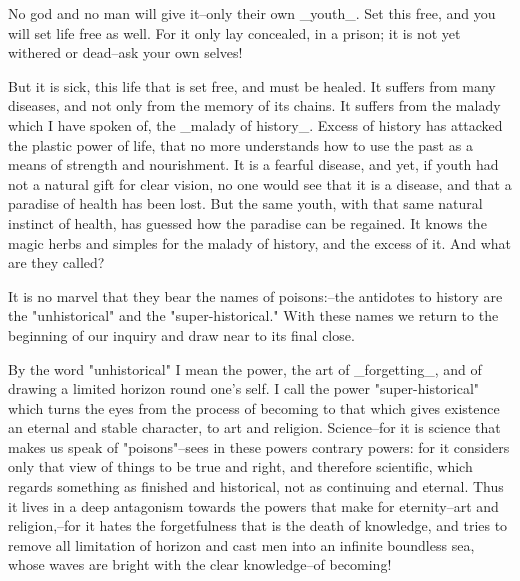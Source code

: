 No god and no man will give it--only their own _youth_. Set this
free, and you will set life free as well. For it only lay concealed,
in a prison; it is not yet withered or dead--ask your own selves!

But it is sick, this life that is set free, and must be healed. It
suffers from many diseases, and not only from the memory of its
chains. It suffers from the malady which I have spoken of, the
_malady of history_. Excess of history has attacked the plastic power
of life, that no more understands how to use the past as a means of
strength and nourishment. It is a fearful disease, and yet, if youth
had not a natural gift for clear vision, no one would see that it is
a disease, and that a paradise of health has been lost. But the same
youth, with that same natural instinct of health, has guessed how the
paradise can be regained. It knows the magic herbs and simples for
the malady of history, and the excess of it. And what are they
called?

It is no marvel that they bear the names of poisons:--the antidotes
to history are the "unhistorical" and the "super-historical." With
these names we return to the beginning of our inquiry and draw near
to its final close.

By the word "unhistorical" I mean the power, the art of _forgetting_,
and of drawing a limited horizon round one's self. I call the power
"super-historical" which turns the eyes from the process of becoming
to that which gives existence an eternal and stable character, to art
and religion. Science--for it is science that makes us speak of
"poisons"--sees in these powers contrary powers: for it considers
only that view of things to be true and right, and therefore
scientific, which regards something as finished and historical, not
as continuing and eternal. Thus it lives in a deep antagonism towards
the powers that make for eternity--art and religion,--for it hates
the forgetfulness that is the death of knowledge, and tries to remove
all limitation of horizon and cast men into an infinite boundless
sea, whose waves are bright with the clear knowledge--of becoming!

